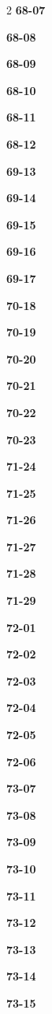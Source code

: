 \documentclass[10pt,a4paper]{article}
\begin{document}
\begin{multicols}{2}
\noindent\textbf{68-07}\ \par
\noindent\textbf{68-08}\ \par
\noindent\textbf{68-09}\ \par
\noindent\textbf{68-10}\ \par
\noindent\textbf{68-11}\ \par
\noindent\textbf{68-12}\ \par
\noindent\textbf{69-13}\ \par
\noindent\textbf{69-14}\ \par
\noindent\textbf{69-15}\ \par
\noindent\textbf{69-16}\ \par
\noindent\textbf{69-17}\ \par
\noindent\textbf{70-18}\ \par
\noindent\textbf{70-19}\ \par
\noindent\textbf{70-20}\ \par
\noindent\textbf{70-21}\ \par
\noindent\textbf{70-22}\ \par
\noindent\textbf{70-23}\ \par
\noindent\textbf{71-24}\ \par
\noindent\textbf{71-25}\ \par
\noindent\textbf{71-26}\ \par
\noindent\textbf{71-27}\ \par
\noindent\textbf{71-28}\ \par
\noindent\textbf{71-29}\ \par
\noindent\textbf{72-01}\ \par
\noindent\textbf{72-02}\ \par
\noindent\textbf{72-03}\ \par
\noindent\textbf{72-04}\ \par
\noindent\textbf{72-05}\ \par
\noindent\textbf{72-06}\ \par
\noindent\textbf{73-07}\ \par
\noindent\textbf{73-08}\ \par
\noindent\textbf{73-09}\ \par
\noindent\textbf{73-10}\ \par
\noindent\textbf{73-11}\ \par
\noindent\textbf{73-12}\ \par
\noindent\textbf{73-13}\ \par
\noindent\textbf{73-14}\ \par
\noindent\textbf{73-15}\ \par

\end{multicols}
\end{document}
